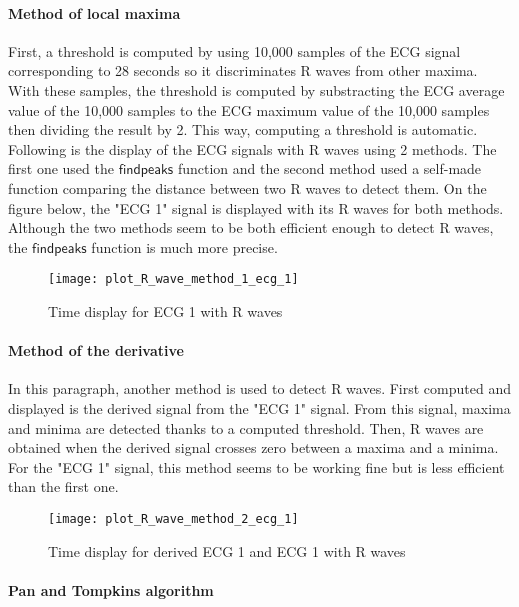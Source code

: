 \documentclass[11pt]{article}
\begin{document}
	\paragraph*{Method of local maxima} 
	
	First, a threshold is computed by using 10,000 samples of the ECG signal corresponding to 28 seconds so it discriminates R waves from other maxima. With these samples, the threshold is computed by substracting the ECG average value of the 10,000 samples to the ECG maximum value of the 10,000 samples then dividing the result by 2. This way, computing a threshold is automatic.
Following is the display of the ECG signals with R waves using 2 methods. The first one used the $\mathsf{findpeaks}$ function and the second method used a self-made function comparing the distance between two R waves to detect them. On the figure below, the "ECG 1" signal is displayed with its R waves for both methods. Although the two methods seem to be both efficient enough to detect R waves, the $\mathsf{findpeaks}$ function is much more precise. 

	\begin{figure}[H]
	\centering
	\texttt{[image: plot\_R\_wave\_method\_1\_ecg\_1]}
	\caption{Time display for ECG 1 with R waves}
	\end{figure}

    \paragraph*{Method of the derivative}

In this paragraph, another method is used to detect R waves. First computed and displayed is the  derived signal from the "ECG 1" signal. From this signal, maxima and minima are detected thanks to a computed threshold. Then, R waves are obtained when the derived signal crosses zero between a maxima and a minima. For the "ECG 1" signal, this method seems to be working fine but is less efficient than the first one. 
	
	\begin{figure}[H]
	\centering
	\texttt{[image: plot\_R\_wave\_method\_2\_ecg\_1]}
	\caption{Time display for derived ECG 1 and ECG 1 with R waves}
	\end{figure}

    \paragraph*{Pan and Tompkins algorithm} 
    
\end{document}
